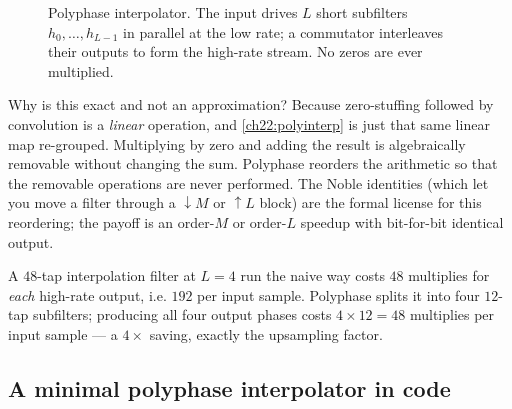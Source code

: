 \begin{figure}[H]
\centering
{}
\caption{Polyphase interpolator. The input drives $L$ short subfilters
$h_0,\dots,h_{L-1}$ in parallel at the low rate; a commutator interleaves their
outputs to form the high-rate stream. No zeros are ever multiplied.}
\label{ch22:fig-polyphase}
\end{figure}

\begin{whybox}
Why is this exact and not an approximation? Because zero-stuffing followed by
convolution is a \emph{linear} operation, and \eqref{ch22:polyinterp} is just
that same linear map re-grouped. Multiplying by zero and adding the result is
algebraically removable without changing the sum. Polyphase reorders the
arithmetic so that the removable operations are never performed. The Noble
identities (which let you move a filter through a $\downarrow M$ or $\uparrow L$
block) are the formal license for this reordering; the payoff is an order-$M$ or
order-$L$ speedup with bit-for-bit identical output.
\end{whybox}

\begin{example}
\label{ch22:ex-taps}
A $48$-tap interpolation filter at $L=4$ run the naive way costs $48$ multiplies
for \emph{each} high-rate output, i.e. $192$ per input sample. Polyphase splits it
into four $12$-tap subfilters; producing all four output phases costs
$4 \times 12 = 48$ multiplies per input sample --- a $4\times$ saving, exactly the
upsampling factor.
\end{example}

\subsection{A minimal polyphase interpolator in code}

